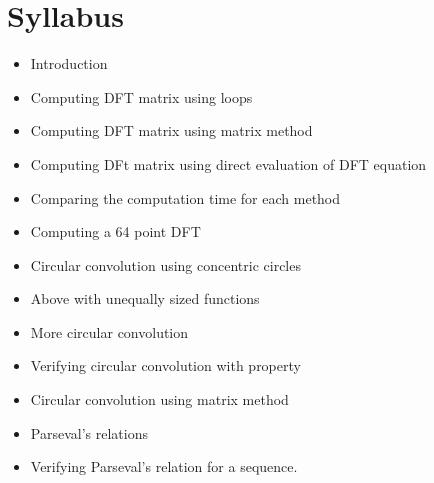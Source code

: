 \documentclass[../course]{subfiles}
\begin{document}
\section {Syllabus}

\begin{itemize}

    \item Introduction
    \item Computing DFT matrix using loops
    \item Computing DFT matrix using matrix method
    \item Computing DFt matrix using direct evaluation of DFT equation
    \item Comparing the computation time for each method
    \item Computing a 64 point DFT
    \item Circular convolution using concentric circles
    \item Above with unequally sized functions
    \item More circular convolution
    \item Verifying circular convolution with property
    \item Circular convolution using matrix method
    \item Parseval's relations
    \item Verifying Parseval's relation for a sequence.

\end{itemize}
\end{document}
